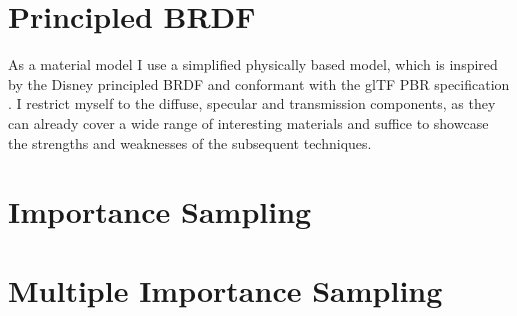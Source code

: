 \section{Principled BRDF}

As a material model I use a simplified physically based model, which is inspired by the Disney principled BRDF  and conformant with the glTF PBR specification .
I restrict myself to the diffuse, specular and transmission components, as they can already cover a wide range of interesting materials and suffice to showcase the strengths and weaknesses of the subsequent techniques.

\section{Importance Sampling}

\section{Multiple Importance Sampling}